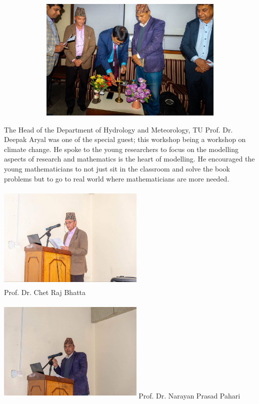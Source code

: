 \documentclass[a4paper,12pt]{report}
\begin{document}
\vspace*{4mm}

\begin{figure}[h!]
  \centering
  \includegraphics[width=15cm, height=5.9cm]{inauguration.jpg}
\end{figure}

\vspace*{5mm}

\noindent
The Head of the Department of Hydrology and Meteorology, TU Prof. Dr. Deepak Aryal was one of the special guest; this workshop being a workshop on climate change. He spoke to the young researchers to focus on the modelling aspects of research and mathematics is the heart of modelling. He encouraged the young mathematicians to not just sit in the classroom and solve the book problems but to go to real world where mathematicians are more needed.

\vspace{3mm}
\begin{multicols}{2}
  \includegraphics[width=7cm, height=5cm]{chet.jpeg}\\
  \hspace*{5mm}Prof. Dr. Chet Raj Bhatta

  \columnbreak
  \includegraphics[width=7cm, height=5cm]{np.jpeg}
  \hspace*{3mm} Prof. Dr. Narayan Prasad Pahari
\end{multicols}
\end{document}
